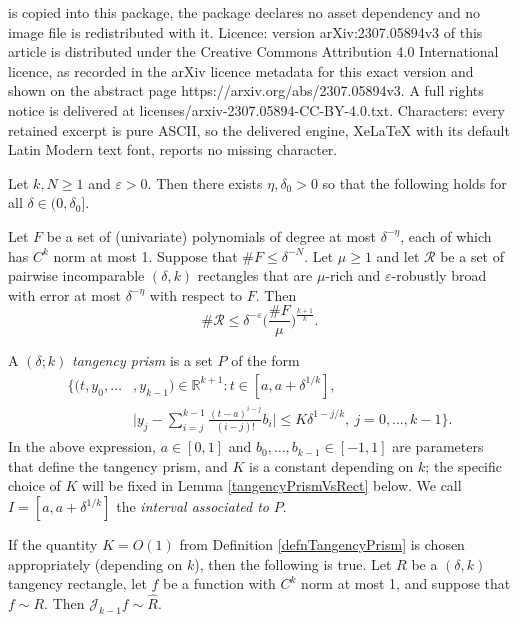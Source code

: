 \documentclass[10pt,a4paper]{amsart}
\newcommand{\RR}{\mathbb{R}}
\newcommand{\eps}{\varepsilon}
\begin{document}
is copied into this package, the package declares no asset dependency and no image file is redistributed with it. Licence: version arXiv:2307.05894v3 of this article is distributed under the Creative Commons Attribution 4.0 International licence, as recorded in the arXiv licence metadata for this exact version and shown on the abstract page https://arxiv.org/abs/2307.05894v3. A full rights notice is delivered at licenses/arxiv-2307.05894-CC-BY-4.0.txt. Characters: every retained excerpt is pure ASCII, so the delivered engine, XeLaTeX with its default Latin Modern text font, reports no missing character.
\begin{thm}\label{RectBoundThm}
Let $k,N\geq 1$ and $\eps>0$. Then there exists $\eta,\delta_0>0$ so that the following holds for all $\delta\in(0,\delta_0]$. 

Let $F$ be a set of (univariate) polynomials of degree at most $\delta^{-\eta}$, each of which has $C^{k}$ norm at most 1. Suppose that $\#F\leq\delta^{-N}$. Let $\mu\geq 1$ and let $\mathcal{R}$ be a set of pairwise incomparable $(\delta,k)$ rectangles that are $\mu$-rich and $\eps$-robustly broad with error at most $\delta^{-\eta}$ with respect to $F$. Then
\begin{equation}\label{RectBdEqn}
\# \mathcal{R} \leq \delta^{-\eps} \Big(\frac{\# F}{\mu}\Big)^{\frac{k+1}{k}}.
\end{equation}
\end{thm}

\begin{defn}\label{defnTangencyPrism}
A $(\delta;k)$ \emph{tangency prism} is a set $P$ of the form
\begin{equation}\label{tangencyPrismEqn}
\begin{split}
\Big\{(t, y_0,\ldots&,y_{k-1})\in\RR^{k+1}\colon  t\in [a, a+\delta^{1/k}],\\
&\Big| y_j - \sum_{i=j}^{k-1}\frac{(t-a)^{i-j}}{(i-j)!}b_i\Big|\leq K\delta^{1-j/k},\ j=0,\ldots,k-1\Big\}.
\end{split}
\end{equation}
In the above expression, $a\in[0,1]$ and $b_0,\ldots,b_{k-1}\in [-1,1]$ are parameters that define the tangency prism, and $K$ is a constant depending on $k$; the specific choice of $K$ will be fixed in Lemma \ref{tangencyPrismVsRect} below. We call $I = [a, a+\delta^{1/k}]$ the \emph{interval associated to} $P$.
\end{defn}

\begin{lem}\label{tangencyPrismVsRect}
If the quantity $K=O(1)$ from Definition \ref{defnTangencyPrism} is chosen appropriately (depending on $k$), then the following is true. Let $R$ be a $(\delta,k)$ tangency rectangle, let $f$ be a function with $C^k$ norm at most 1, and suppose that $f\sim R$. Then $\mathcal{J}_{k-1}f\sim \hat R$.
\end{lem}
\end{document}
